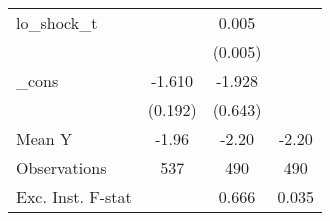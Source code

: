 {\begin{tabular}{l*{3}{c}}
\addlinespace
lo\_shock\_t  &                     &       0.005         &                     \\
            &                     &     (0.005)         &                     \\
\addlinespace
\_cons      &      -1.610\sym{***}&      -1.928\sym{***}&                     \\
            &     (0.192)         &     (0.643)         &                     \\
\midrule
Mean Y      &       -1.96         &       -2.20         &       -2.20         \\
Observations&         537         &         490         &         490         \\
Exc. Inst. F-stat&                     &       0.666         &       0.035         \\
\bottomrule
\end{tabular}
}
